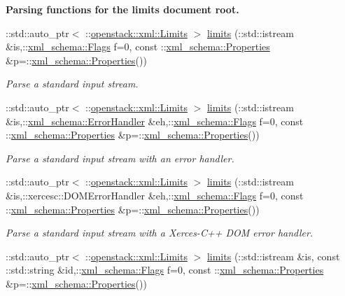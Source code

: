 \begin{Indent}{\bf Parsing functions for the limits document root.}
\begin{DoxyCompactItemize}
::std::auto\_\-ptr$<$ ::\hyperlink{classopenstack_1_1xml_1_1Limits}{openstack::xml::Limits} $>$ \hyperlink{namespaceopenstack_1_1xml_a0791b34084c20fe5750d69b1abee91b6}{limits} (::std::istream \&is,::\hyperlink{namespacexml__schema_affb4c227cbd9aa7453dd1dc5a1401943}{xml\_\-schema::Flags} f=0, const ::\hyperlink{namespacexml__schema_ad27ce19a7ee1d3b1064092648898f64c}{xml\_\-schema::Properties} \&p=::\hyperlink{namespacexml__schema_ad27ce19a7ee1d3b1064092648898f64c}{xml\_\-schema::Properties}())
\begin{DoxyCompactList}\small\item\em Parse a standard input stream. \item\end{DoxyCompactList}\item 
::std::auto\_\-ptr$<$ ::\hyperlink{classopenstack_1_1xml_1_1Limits}{openstack::xml::Limits} $>$ \hyperlink{namespaceopenstack_1_1xml_af98489c389a5138afd80bf6345da82d9}{limits} (::std::istream \&is,::\hyperlink{namespacexml__schema_ab1c9361bfd3b404eaabf0c31eded79dc}{xml\_\-schema::ErrorHandler} \&eh,::\hyperlink{namespacexml__schema_affb4c227cbd9aa7453dd1dc5a1401943}{xml\_\-schema::Flags} f=0, const ::\hyperlink{namespacexml__schema_ad27ce19a7ee1d3b1064092648898f64c}{xml\_\-schema::Properties} \&p=::\hyperlink{namespacexml__schema_ad27ce19a7ee1d3b1064092648898f64c}{xml\_\-schema::Properties}())
\begin{DoxyCompactList}\small\item\em Parse a standard input stream with an error handler. \item\end{DoxyCompactList}\item 
::std::auto\_\-ptr$<$ ::\hyperlink{classopenstack_1_1xml_1_1Limits}{openstack::xml::Limits} $>$ \hyperlink{namespaceopenstack_1_1xml_abad02d714b7520021890d47d853a4f0b}{limits} (::std::istream \&is,::xercesc::DOMErrorHandler \&eh,::\hyperlink{namespacexml__schema_affb4c227cbd9aa7453dd1dc5a1401943}{xml\_\-schema::Flags} f=0, const ::\hyperlink{namespacexml__schema_ad27ce19a7ee1d3b1064092648898f64c}{xml\_\-schema::Properties} \&p=::\hyperlink{namespacexml__schema_ad27ce19a7ee1d3b1064092648898f64c}{xml\_\-schema::Properties}())
\begin{DoxyCompactList}\small\item\em Parse a standard input stream with a Xerces-\/C++ DOM error handler. \item\end{DoxyCompactList}\item 
::std::auto\_\-ptr$<$ ::\hyperlink{classopenstack_1_1xml_1_1Limits}{openstack::xml::Limits} $>$ \hyperlink{namespaceopenstack_1_1xml_a1da5dba9ce3717dfdbda299834e1fc15}{limits} (::std::istream \&is, const ::std::string \&id,::\hyperlink{namespacexml__schema_affb4c227cbd9aa7453dd1dc5a1401943}{xml\_\-schema::Flags} f=0, const ::\hyperlink{namespacexml__schema_ad27ce19a7ee1d3b1064092648898f64c}{xml\_\-schema::Properties} \&p=::\hyperlink{namespacexml__schema_ad27ce19a7ee1d3b1064092648898f64c}{xml\_\-schema::Properties}())

\end{DoxyCompactItemize}
\end{Indent}
